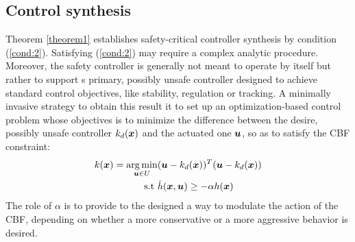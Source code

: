 \subsection{Control synthesis}
Theorem  \ref{theorem1} establishes safety-critical controller synthesis by condition (\ref{cond:2}). Satisfying  (\ref{cond:2}) may require a complex analytic procedure. Moreover, the safety controller is generally not meant to operate by itself but rather to support s primary, possibly unsafe controller designed to achieve standard control objectives, like stability, regulation or tracking. A minimally invasive strategy to obtain this result it to set up an optimization-based control problem whose objectives is to minimize the difference between the desire, possibly unsafe controller $k_d(\boldsymbol{x})$ and the actuated one $\boldsymbol{u}$, so as to satisfy the CBF constraint:
\begin{equation}
\begin{aligned}
k(\boldsymbol{x})=\underset{\boldsymbol{u}\in U}{\arg\min}  &(\boldsymbol{u}-k_d(\boldsymbol{x}))^T(\boldsymbol{u}-k_d(\boldsymbol{x})) \\ 
\mathrm{s.t}\,\, &\dot{h}(\boldsymbol{x},\boldsymbol{u})\geq -\alpha h(\boldsymbol{x})
\end{aligned}
\end{equation}
The role of $\alpha$ is to provide to the designed a way to modulate the action of the CBF, depending on whether a more conservative or a more aggressive behavior is desired.

